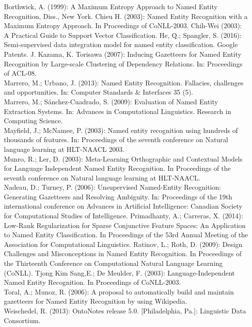 \documentclass[bibliography=totoc]{scrartcl}
\begin{document}
	\newpage
	\begin{thebibliography}{15}
		 Borthwick, A. (1999):
		A Maximum Entropy Approach to Named Entity Recognition, Diss., New York.
		 Chieu H. (2003): Named Entity Recognition with a Maximum Entropy Approach. In Proceedings of CoNLL-2003.
		 Chih-Wei (2003): A Practical Guide to Support Vector Classification.
		 He, Q.; Spangler, S. (2016): Semi-supervised data integration model for named entity classification. Google Patents.
		  J. Kazama, K. Torisawa (2007): Inducing Gazetteers for Named Entity Recognition
		by Large-scale Clustering of Dependency Relations. In: Proceedings of ACL-08.\\
		 Marrero, M.; Urbano, J. (2013): Named Entity Recognition. Fallacies, challenges and opportunities. In: Computer Standards \& Interfaces 35 (5).\\
		 Marrero, M.; Sánchez-Cuadrado, S. (2009): Evaluation of Named Entity Extraction Systems. In: Advances in Computational Linguistics. Research in Computing Science.\\
		  Mayfield, J.; McNamee, P. (2003): Named entity recognition using hundreds of thousands of features. In: Proceedings of the seventh conference on Natural language learning at HLT-NAACL 2003.\\
		  Munro, R.; Ler, D. (2003): Meta-Learning Orthographic and Contextual Models for Language Independent Named Entity Recognition. In Proceedings of the seventh conference on Natural language learning at HLT-NAACL.\\
		 Nadeau, D.; Turney, P. (2006): Unsupervised Named-Entity Recognition: Generating Gazetteers and Resolving Ambiguity. In: Proceedings of the 19th international conference on Advances in Artificial Intelligence: Canadian Society for Computational Studies of Intelligence.
		 Primadhanty, A.; Carreras, X. (2014): Low-Rank Regularization for Sparse Conjunctive Feature Spaces:
		An Application to Named Entity Classification. In Proceedings of the 53rd Annual Meeting of the Association for Computational Linguistics.
		 Ratinov, L.; Roth, D. (2009): Design Challenges and Misconceptions in Named Entity Recognition. In Proceedings of the Thirteenth Conference on Computational Natural Language Learning (CoNLL).
		 Tjong Kim Sang,E.; De Meulder, F. (2003): Language-Independent Named Entity Recognition. In
		Proceedings of 	CoNLL-2003.\\
		 Toral, A.; Munoz, R. (2006): A proposal to automatically build and maintain gazetteers for Named Entity Recognition by using Wikipedia.\\
		 Weischedel, R. (2013): OntoNotes release 5.0. [Philadelphia, Pa.]: Linguistic Data Consortium.\\
	\end{thebibliography}
	
\end{document}
